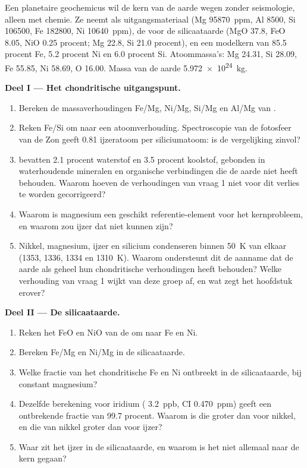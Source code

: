 \begin{problem}
\label{pb:b2:elements-in-the-earth:1}
Een planetaire geochemicus wil de kern van de aarde wegen zonder seismologie, alleen
met chemie. Ze neemt  als uitgangsmateriaal (Mg
\qty{95870}{ppm}, Al 8500, Si \num{106500}, Fe \num{182800}, Ni
\qty{10640}{ppm}), de  voor de silicaataarde (MgO 37.8, FeO
8.05, NiO 0.25 procent; Mg 22.8, Si 21.0 procent), en een modelkern van 85.5
procent Fe, 5.2 procent Ni en 6.0 procent Si. Atoommassa's: Mg 24.31,
Si 28.09, Fe 55.85, Ni 58.69, O 16.00. Massa van de aarde
\qty{5.972e24}{kg}.

\medskip\noindent\textbf{Deel I --- Het chondritische uitgangspunt.}
\begin{enumerate}
\item Bereken de massaverhoudingen Fe/Mg, Ni/Mg, Si/Mg en Al/Mg van .
\item Reken Fe/Si om naar een atoomverhouding. Spectroscopie van de fotosfeer van de Zon
geeft 0.81 ijzeratoom per siliciumatoom: is de vergelijking zinvol?
\item {} bevatten 2.1 procent waterstof en 3.5 procent koolstof, gebonden in
waterhoudende mineralen en organische verbindingen die de aarde niet heeft behouden. Waarom
hoeven de verhoudingen van vraag 1 niet voor dit verlies te worden gecorrigeerd?
\item Waarom is magnesium een geschikt referentie-element voor het kernprobleem, en
waarom zou ijzer dat niet kunnen zijn?
\item Nikkel, magnesium, ijzer en silicium condenseren binnen \qty{50}{K} van
elkaar (1353, 1336, 1334 en \qty{1310}{K}). Waarom ondersteunt dit de
aanname dat de aarde als geheel hun chondritische verhoudingen heeft behouden? Welke verhouding van
vraag 1 wijkt van deze groep af, en wat zegt het hoofdstuk erover?
\end{enumerate}

\noindent\textbf{Deel II --- De silicaataarde.}
\begin{enumerate}[resume]
\item Reken het FeO en NiO van de  om naar Fe en Ni.
\item Bereken Fe/Mg en Ni/Mg in de silicaataarde.
\item Welke fractie van het chondritische Fe en Ni ontbreekt in de silicaataarde,
bij constant magnesium?
\item Dezelfde berekening voor iridium ( \qty{3.2}{ppb}, CI
\qty{0.470}{ppm}) geeft een ontbrekende fractie van 99.7 procent. Waarom is die groter
dan voor nikkel, en die van nikkel groter dan voor ijzer?
\item Waar zit het ijzer in de silicaataarde, en waarom is het niet allemaal naar de
kern gegaan?
\end{enumerate}


\end{problem}
